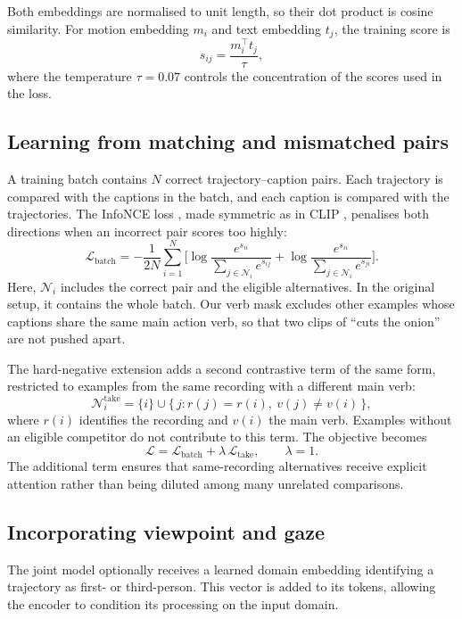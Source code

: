 \documentclass[10pt,twocolumn,letterpaper]{article}
\begin{document}
Both embeddings are normalised to unit length, so their dot product is cosine similarity. For motion embedding $m_i$ and text embedding
$t_j$, the training score is
\begin{equation}
s_{ij} = \frac{m_i^\top t_j}{\tau},
\end{equation}
where the temperature $\tau=0.07$ controls the concentration of the scores used in the loss.

\subsection{Learning from matching and mismatched pairs}
\label{sec:loss}
A training batch contains $N$ correct trajectory--caption pairs. Each trajectory is compared with the captions in
the batch, and each caption is compared with the trajectories. The InfoNCE loss \cite{oord2018cpc}, made symmetric as in CLIP \cite{radford2021clip},
penalises both directions when an incorrect pair scores too highly:
\begin{equation}
\mathcal{L}_{\text{batch}} = -\frac{1}{2N}\sum_{i=1}^{N}\Big[\log\frac{e^{s_{ii}}}{\sum_{j\in\mathcal{N}_i}e^{s_{ij}}}
+\log\frac{e^{s_{ii}}}{\sum_{j\in\mathcal{N}_i}e^{s_{ji}}}\Big].
\label{eq:batch}
\end{equation}
Here, $\mathcal{N}_i$ includes the correct pair and the eligible alternatives. In the original setup, it contains
the whole batch. Our verb mask excludes other examples whose captions share the same main action verb, so that two
clips of ``cuts the onion'' are not pushed apart.

The hard-negative extension adds a second contrastive term of the same form, restricted to examples from the same
recording with a different main verb:
\begin{equation}
\mathcal{N}_i^{\text{take}} = \{i\}\cup\{\,j : r(j)=r(i),\ v(j)\neq v(i)\,\},
\end{equation}
where $r(i)$ identifies the recording and $v(i)$ the main verb. Examples without an eligible competitor do not
contribute to this term. The objective becomes
\begin{equation}
\mathcal{L} = \mathcal{L}_{\text{batch}} + \lambda\,\mathcal{L}_{\text{take}}, \qquad \lambda = 1.
\end{equation}
The additional term ensures that same-recording alternatives receive explicit attention rather than being diluted
among many unrelated comparisons.

\subsection{Incorporating viewpoint and gaze}
The joint model optionally receives a learned domain embedding identifying a trajectory as first- or third-person.
This vector is added to its tokens, allowing the encoder to condition its processing on the input domain.
\end{document}
